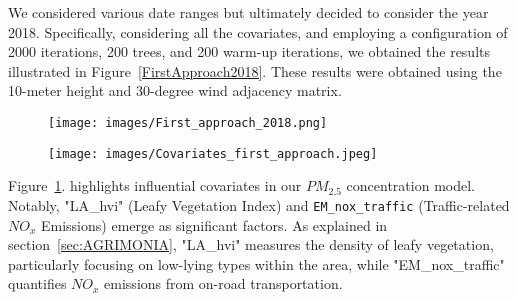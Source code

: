 \documentclass[11pt,a4paper]{article}
\begin{document}
We considered various date ranges but ultimately decided to consider the year 2018. Specifically, considering all the covariates, and employing a configuration of 2000 iterations, 200 trees, and 200 warm-up iterations, we obtained the results illustrated in Figure~\ref{FirstApproach2018}.
These results were obtained using the 10-meter height and 30-degree wind adjacency matrix.

\begin{figure} [H]
    \begin{minipage}{0.5\textwidth}
        \centering
        \texttt{[image: images/First\_approach\_2018.png]}
        \vspace{1.7cm}
        \label{FirstApproach2018}
    \end{minipage}%
    \begin{minipage}{0.5\textwidth}
        \centering
        \texttt{[image: images/Covariates\_first\_approach.jpeg]}
        \captionsetup{format=hang}
        \label{fig:Covariates_first_approach2018}
    \end{minipage}
\end{figure}


Figure~\ref{fig:Covariates_first_approach2018}. highlights influential covariates in our $PM_{\text{2.5}}$ concentration model. Notably, "LA\_hvi" (Leafy Vegetation Index) and \texttt{EM\_nox\_traffic} (Traffic-related $NO_{x}$ Emissions) emerge as significant factors. As explained in section~\ref{sec:AGRIMONIA}, "LA\_hvi" measures the density of leafy vegetation, particularly focusing on low-lying types within the area, while "EM\_nox\_traffic" quantifies $NO_{x}$ emissions from on-road transportation.

\end{document}
